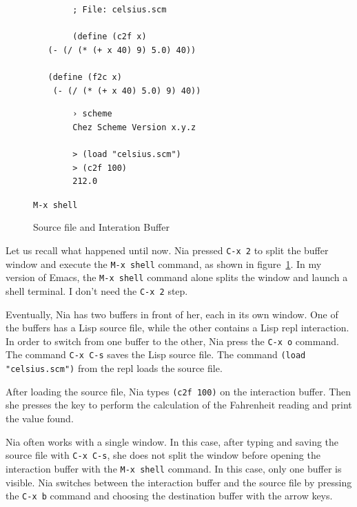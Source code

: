 \documentclass[a4paper,12pt]{book}
\newenvironment{fmpage}[1]
{\begin{lrbox}{\fmbox}\begin{minipage}{#1}}
{\end{minipage}\end{lrbox}\fbox{\usebox{\fmbox}}}
\begin{document}
\begin{figure}[!h]
	\begin{fmpage}{0.8\linewidth}
		\begin{verbatim}
		; File: celsius.scm

		(define (c2f x)
   (- (/ (* (+ x 40) 9) 5.0) 40))

   (define (f2c x)
    (- (/ (* (+ x 40) 5.0) 9) 40))

		\end{verbatim}
	\end{fmpage}

	\begin{fmpage}{0.8\linewidth}
		\begin{verbatim}
		› scheme
		Chez Scheme Version x.y.z

		> (load "celsius.scm")
		> (c2f 100)
		212.0
		\end{verbatim}
	\end{fmpage}
	\begin{fmpage}{0.8\linewidth}
		\verb|M-x shell|
	\end{fmpage}
	\caption{Source file and Interation Buffer}
	\label{fig:repl}
\end{figure}

Let us recall what happened until now. Nia pressed
\verb|C-x 2| to split  the buffer window and execute the
\verb|M-x shell| command, as shown in figure~\ref{fig:repl}.
In my version of Emacs, the \verb|M-x shell| command alone
splits the window and launch a shell terminal. I don't
need the \verb|C-x 2| step.

Eventually, Nia has two buffers in front of her, each in
its own window. One of the buffers has a Lisp source file,
while the other contains a Lisp repl interaction. In order
to  switch from one buffer to the other, Nia press the
\verb|C-x o| command. The command \verb|C-x C-s| saves the
Lisp source file.  The command \verb|(load "celsius.scm")|
from the repl loads the  source file.

After loading the source file, Nia types \verb|(c2f 100)|
on the interaction buffer. Then she presses the
 key to perform the calculation of the Fahrenheit
reading and print the value found.

Nia often works with a single window.  In this case, after
typing and saving the source file with \verb|C-x C-s|, she
does not split the window before opening the interaction
buffer with the \verb|M-x shell| command. In this case,
only one buffer is visible. Nia switches  between the
interaction buffer and the source file by pressing the
\verb|C-x b| command and choosing the destination buffer
with the arrow \keys{~$\uparrow$~} \keys{~$\downarrow$~}
keys.
\end{document}
